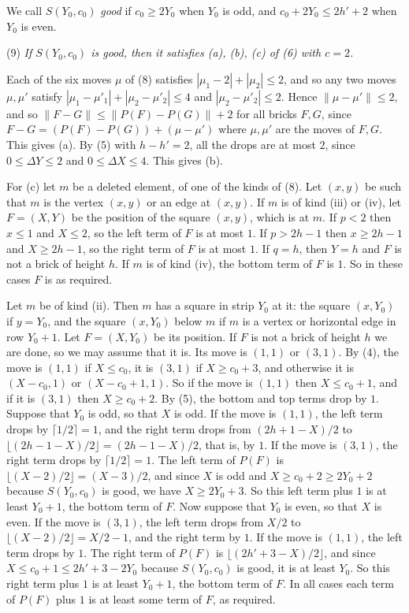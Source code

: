 {We call $S(Y_0, c_0)$ \textit{good} if $c_0 \ge 2Y_0$ when $Y_0$ is odd, and $c_0 + 2Y_0 \le 2h' + 2$ when $Y_0$ is even.

\hspace*{12pt}(9) \textit{If $S(Y_0, c_0)$ is good, then it satisfies (a), (b), (c) of (6) with $c = 2$.}

Each of the six moves $\mu$ of (8) satisfies $|\mu_1 - 2| + |\mu_2| \le 2$, and so any two moves $\mu, \mu'$ satisfy $|\mu_1 - \mu'_1| + |\mu_2 - \mu'_2| \le 4$ and $|\mu_2 - \mu'_2| \le 2$. Hence $\|\mu - \mu'\| \le 2$, and so $\|F - G\| \le \|P(F) - P(G)\| + 2$ for all bricks $F, G$, since $F - G = (P(F) - P(G)) + (\mu - \mu')$ where $\mu, \mu'$ are the moves of $F, G$. This gives (a). By (5) with $h - h' = 2$, all the drops are at most $2$, since $0 \le \Delta Y \le 2$ and $0 \le \Delta X \le 4$. This gives (b).

For (c) let $m$ be a deleted element, of one of the kinds of (8). Let $(x, y)$ be such that $m$ is the vertex $(x, y)$ or an edge at $(x, y)$. If $m$ is of kind (iii) or (iv), let $F = (X, Y)$ be the position of the square $(x, y)$, which is at $m$. If $p < 2$ then $x \le 1$ and $X \le 2$, so the left term of $F$ is at most $1$. If $p > 2h - 1$ then $x \ge 2h - 1$ and $X \ge 2h - 1$, so the right term of $F$ is at most $1$. If $q = h$, then $Y = h$ and $F$ is not a brick of height $h$. If $m$ is of kind (iv), the bottom term of $F$ is $1$. So in these cases $F$ is as required.

Let $m$ be of kind (ii). Then $m$ has a square in strip $Y_0$ at it: the square $(x, Y_0)$ if $y = Y_0$, and the square $(x, Y_0)$ below $m$ if $m$ is a vertex or horizontal edge in row $Y_0 + 1$. Let $F = (X, Y_0)$ be its position. If $F$ is not a brick of height $h$ we are done, so we may assume that it is. Its move is $(1, 1)$ or $(3, 1)$. By (4), the move is $(1, 1)$ if $X \le c_0$, it is $(3, 1)$ if $X \ge c_0 + 3$, and otherwise it is $(X - c_0, 1)$ or $(X - c_0 + 1, 1)$. So if the move is $(1, 1)$ then $X \le c_0 + 1$, and if it is $(3, 1)$ then $X \ge c_0 + 2$. By (5), the bottom and top terms drop by $1$. Suppose that $Y_0$ is odd, so that $X$ is odd. If the move is $(1, 1)$, the left term drops by $\lceil 1/2 \rceil = 1$, and the right term drops from $(2h + 1 - X)/2$ to $\lfloor (2h - 1 - X)/2 \rfloor = (2h - 1 - X)/2$, that is, by $1$. If the move is $(3, 1)$, the right term drops by $\lceil 1/2 \rceil = 1$. The left term of $P(F)$ is $\lfloor (X - 2)/2 \rfloor = (X - 3)/2$, and since $X$ is odd and $X \ge c_0 + 2 \ge 2Y_0 + 2$ because $S(Y_0, c_0)$ is good, we have $X \ge 2Y_0 + 3$. So this left term plus $1$ is at least $Y_0 + 1$, the bottom term of $F$. Now suppose that $Y_0$ is even, so that $X$ is even. If the move is $(3, 1)$, the left term drops from $X/2$ to $\lfloor (X - 2)/2 \rfloor = X/2 - 1$, and the right term by $1$. If the move is $(1, 1)$, the left term drops by $1$. The right term of $P(F)$ is $\lfloor (2h' + 3 - X)/2 \rfloor$, and since $X \le c_0 + 1 \le 2h' + 3 - 2Y_0$ because $S(Y_0, c_0)$ is good, it is at least $Y_0$. So this right term plus $1$ is at least $Y_0 + 1$, the bottom term of $F$. In all cases each term of $P(F)$ plus $1$ is at least some term of $F$, as required.

}
